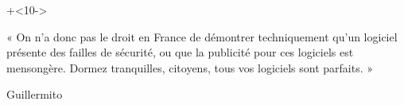 \documentclass[aspectratio=1610]{beamer}%
\begin{document}
\begin{frame}[t]
\begin{columns}
\begin{column}{0.25\linewidth}
      \end{column}
    \end{columns}
      \onslide+<10->{\begin{center}
        « On n'a donc pas le droit en France de démontrer techniquement qu'un logiciel présente des failles
  de sécurité, ou que la publicité pour ces logiciels est mensongère. Dormez tranquilles, citoyens, tous
  vos logiciels sont parfaits. » 
      \end{center}
      \vspace{-1.5\baselineskip}
      \hspace{0.66\linewidth}Guillermito
      }
    \end{frame}
  
\end{document}
